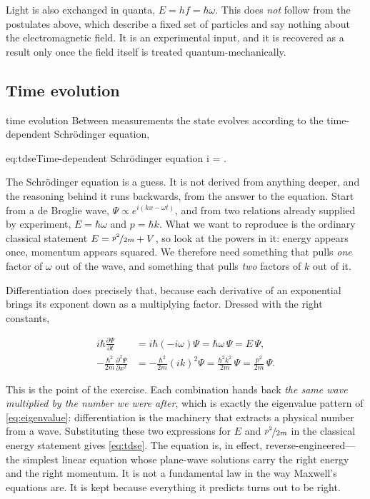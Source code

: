         Light is also exchanged in quanta, $E = hf = \hbar\omega$. This does \emph{not} follow from the postulates above, which describe a fixed set of particles and say nothing about the electromagnetic field. It is an experimental input, and it is recovered as a result only once the field itself is treated quantum-mechanically.

    \subsection{Time evolution}

        \begin{postulate}{time evolution}
            \label{post:evolution}
            Between measurements the state evolves according to the time-dependent Schrödinger equation,
            \begin{keyeq}{eq:tdse}{Time-dependent Schrödinger equation}
                i\hbar{} = \Psi .
            \end{keyeq}
        \end{postulate}

        The Schrödinger equation is a guess. It is not derived from anything deeper, and the reasoning behind it runs backwards, from the answer to the equation. Start from a de Broglie wave, $\Psi \propto e^{i(kx-\omega t)}$, and from two relations already supplied by experiment, $E = \hbar\omega$ and $p = \hbar k$. What we want to reproduce is the ordinary classical statement $E = \nicefrac{p^{2}}{2m} + V$, so look at the powers in it: energy appears once, momentum appears squared. We therefore need something that pulls \emph{one} factor of $\omega$ out of the wave, and something that pulls \emph{two} factors of $k$ out of it.

        Differentiation does precisely that, because each derivative of an exponential brings its exponent down as a multiplying factor. Dressed with the right constants,

        \begin{align*}
            i\hbar\frac{\partial \Psi}{\partial t} &= i\hbar\left(-i\omega\right)\Psi = \hbar\omega\,\Psi = E\,\Psi , \\[4pt]
            -\frac{\hbar^{2}}{2m}\frac{\partial^{2} \Psi}{\partial x^{2}} &= -\frac{\hbar^{2}}{2m}\left(ik\right)^{2}\Psi = \frac{\hbar^{2}k^{2}}{2m}\,\Psi = \frac{p^{2}}{2m}\,\Psi .
        \end{align*}

        This is the point of the exercise. Each combination hands back \emph{the same wave multiplied by the number we were after}, which is exactly the eigenvalue pattern of \cref{eq:eigenvalue}: differentiation is the machinery that extracts a physical number from a wave. Substituting these two expressions for $E$ and $\nicefrac{p^{2}}{2m}$ in the classical energy statement gives \cref{eq:tdse}. The equation is, in effect, reverse-engineered---the simplest linear equation whose plane-wave solutions carry the right energy and the right momentum. It is not a fundamental law in the way Maxwell's equations are. It is kept because everything it predicts turns out to be right.

